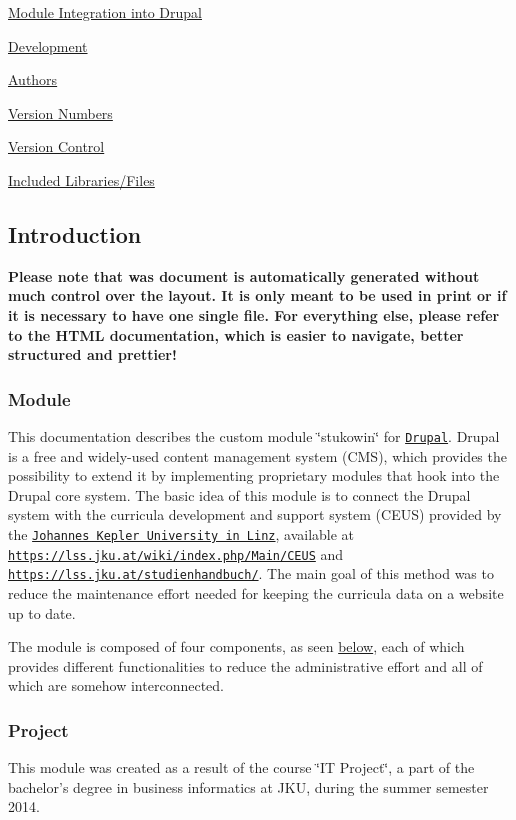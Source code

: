 \begin{DoxyEnumerate}
\begin{DoxyEnumerate}
\item \hyperlink{index_Integration}{Module Integration into Drupal}
\end{DoxyEnumerate}
\item \hyperlink{index_Development}{Development}
\begin{DoxyEnumerate}
\item \hyperlink{index_Authors}{Authors}
\item \hyperlink{index_versionnumbers}{Version Numbers}
\item \hyperlink{index_versioncontrol}{Version Control}
\end{DoxyEnumerate}
\item \hyperlink{index_Included}{Included Libraries/\+Files}
\end{DoxyEnumerate}\hypertarget{index_Introduction}{}\subsection{Introduction}\label{index_Introduction}
 \textrm{\textbf{Please note that was document is automatically generated without much control over the layout. It is only meant to be used in print or if it is necessary to have one single file. For everything else, please refer to the HTML documentation, which is easier to navigate, better structured and prettier!}}  \hypertarget{index_Module_Intro}{}\subsubsection{Module}\label{index_Module_Intro}
This documentation describes the custom module \char`\"{}stukowin\char`\"{} for \href{http://drupal.org/}{\tt Drupal}. Drupal is a free and widely-\/used content management system (C\+M\+S), which provides the possibility to extend it by implementing proprietary modules that hook into the Drupal core system. The basic idea of this module is to connect the Drupal system with the curricula development and support system (C\+E\+U\+S) provided by the \href{http://jku.at}{\tt Johannes Kepler University in Linz}, available at \href{https://lss.jku.at/wiki/index.php/Main/CEUS}{\tt https\+://lss.\+jku.\+at/wiki/index.\+php/\+Main/\+C\+E\+U\+S} and \href{https://lss.jku.at/studienhandbuch/}{\tt https\+://lss.\+jku.\+at/studienhandbuch/}. The main goal of this method was to reduce the maintenance effort needed for keeping the curricula data on a website up to date.

The module is composed of four components, as seen \hyperlink{index_Modules}{below}, each of which provides different functionalities to reduce the administrative effort and all of which are somehow interconnected.\hypertarget{index_Project_Intro}{}\subsubsection{Project}\label{index_Project_Intro}
This module was created as a result of the course \char`\"{}\+I\+T Project\char`\"{}, a part of the bachelor's degree in business informatics at J\+K\+U, during the summer semester 2014.


